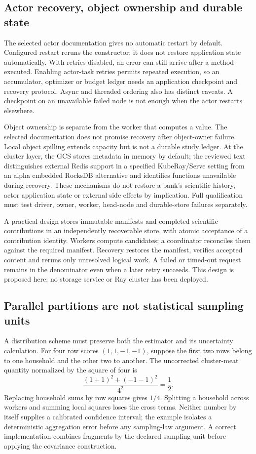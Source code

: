 \subsection{Actor recovery, object ownership and durable state}
The selected actor documentation gives no automatic restart by default. Configured restart reruns the constructor; it does not restore application state automatically. With retries disabled, an error can still arrive after a method executed. Enabling actor-task retries permits repeated execution, so an accumulator, optimizer or budget ledger needs an application checkpoint and recovery protocol. Async and threaded ordering also has distinct caveats. A checkpoint on an unavailable failed node is not enough when the actor restarts elsewhere.~\citep{exec24_ray_sources}

Object ownership is separate from the worker that computes a value. The selected documentation does not promise recovery after object-owner failure. Local object spilling extends capacity but is not a durable study ledger. At the cluster layer, the GCS stores metadata in memory by default; the reviewed text distinguishes external Redis support in a specified KubeRay/Serve setting from an alpha embedded RocksDB alternative and identifies functions unavailable during recovery. These mechanisms do not restore a bank's scientific history, actor application state or external side effects by implication. Full qualification must test driver, owner, worker, head-node and durable-store failures separately.~\citep{exec24_ray_sources}

A practical design stores immutable manifests and completed scientific contributions in an independently recoverable store, with atomic acceptance of a contribution identity. Workers compute candidates; a coordinator reconciles them against the required manifest. Recovery restores the manifest, verifies accepted content and reruns only unresolved logical work. A failed or timed-out request remains in the denominator even when a later retry succeeds. This design is proposed here; no storage service or Ray cluster has been deployed.~\citep{exec24_ray_contract}

\subsection{Parallel partitions are not statistical sampling units}
A distribution scheme must preserve both the estimator and its uncertainty calculation. For four row scores $(1,1,-1,-1)$, suppose the first two rows belong to one household and the other two to another. The uncorrected cluster-meat quantity normalized by the square of four is
\[
 \frac{(1+1)^2+(-1-1)^2}{4^2}=\frac12.
\]
Replacing household sums by row squares gives $1/4$. Splitting a household across workers and summing local squares loses the cross terms. Neither number by itself supplies a calibrated confidence interval; the example isolates a deterministic aggregation error before any sampling-law argument. A correct implementation combines fragments by the declared sampling unit before applying the covariance construction.~\citep{exec24_ray_contract}


